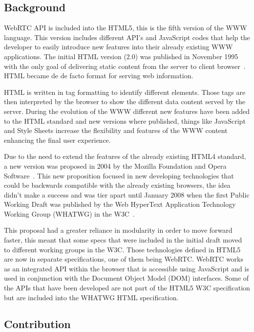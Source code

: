 \subsection{Background}

WebRTC API is included into the HTML5, this is the fifth version of the WWW language. This version includes different API's and JavaScript codes that help the developer to easily introduce new features into their already existing WWW applications. The initial HTML version (2.0) was published in November 1995 with the only goal of delivering static content from the server to client browser~\cite{html2IETF}. HTML became de de facto format for serving web information. 

HTML is written in tag formatting to identify different elements. Those tags are then interpreted by the browser to show the different data content served by the server. During the evolution of the WWW different new features have been added to the HTML standard and new versions where published, things like JavaScript and Style Sheets increase the flexibility and features of the WWW content enhancing the final user experience.

Due to the need to extend the features of the already existing HTML4 standard, a new version was proposed in 2004 by the Mozilla Foundation and Opera Software~\cite{initialHTML5proposition}. This new proposition focused in new developing technologies that could be backwards compatible with the already existing browsers, the idea didn't make a success and was tier apart until January 2008 when the first Public Working Draft was published by the Web HyperText Application Technology Working Group (WHATWG) in the W3C~\cite{firstHTML5draft}.

This proposal had a greater reliance in modularity in order to move forward faster, this meant that some specs that were included in the initial draft moved to different working groups in the W3C. Those technologies defined in HTML5 are now in separate specifications, one of them being WebRTC. WebRTC works as an integrated API within the browser that is accessible using JavaScript and is used in conjunction with the Document Object Model (DOM) interfaces. Some of the APIs that have been developed are not part of the HTML5 W3C specification but are included into the WHATWG HTML specification.

\subsection{Contribution}

